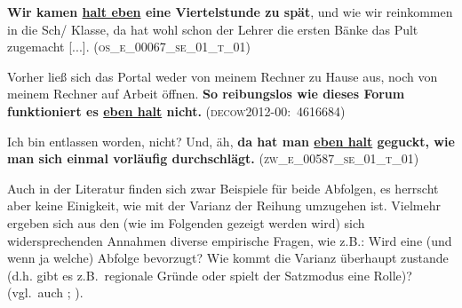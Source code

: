 \begin{exe}
	\ex\label{616} 
	\textbf{Wir kamen \ul{halt eben} eine Viertelstunde zu spät}, und wie wir reinkommen in die
 	Sch/ Klasse, da hat wohl schon der Lehrer die ersten Bänke das Pult zugemacht [...]. 	
 	\hfill\hbox{\textsc{\MakeLowercase{(OS\textminus\textminus\_E\_00067\_SE\_01\_T\_01)}}}
\end{exe}
	
\begin{exe}
	\ex\label{617} 
	Vorher ließ sich das Portal weder von meinem Rechner zu Hause aus, noch von meinem Rechner auf Arbeit öffnen. \textbf{So reibungslos wie dieses Forum funktioniert es \ul{eben halt} nicht.}
	\hbox{}\hfill\hbox{\scshape(decow2012-00: 4616684)}
\end{exe}
											    		                			      			       
\begin{exe}
	\ex\label{618}
 
	Ich bin entlassen worden, nicht? Und, äh, \textbf{da hat man \ul{eben halt} geguckt, wie man sich einmal vorläufig durchschlägt.}    
	\newline\hbox{}\hfill\hbox{\textsc{\MakeLowercase{(ZW\textminus\textminus\_E\_00587\_SE\_01\_T\_01)}}}                         	
\end{exe}	
Auch in der Literatur finden sich zwar Beispiele für beide Abfolgen, es herrscht aber keine Einigkeit, wie mit der Varianz der Reihung umzugehen ist. Vielmehr ergeben sich aus den (wie im Folgenden gezeigt werden wird) sich widersprechenden Annahmen diverse empirische Fragen, wie z.B.: Wird eine (und wenn ja welche) Abfolge bevorzugt? Wie kommt die Varianz überhaupt zustande (d.h. gibt es z.B.\ regionale Gründe oder spielt der Satzmodus eine Rolle)? (vgl.\ auch \citealt[144--165]{Mueller2016b}; \citeyear[233--238]{Mueller2017a}).

